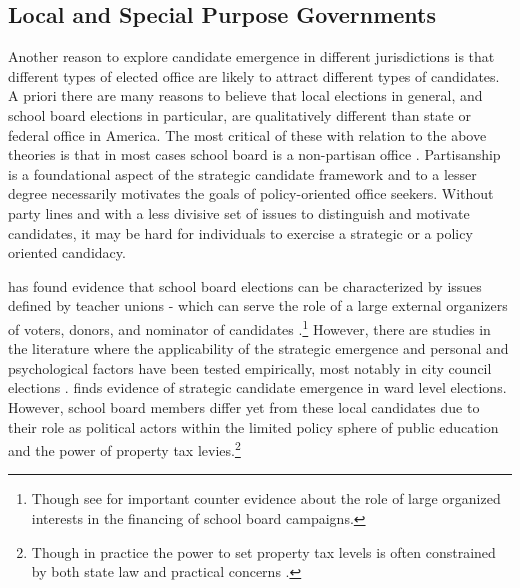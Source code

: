 \subsection{Local and Special Purpose Governments}

Another reason to explore candidate emergence in different jurisdictions is that 
different types of elected office are likely to attract different types of 
candidates. A priori there are many reasons to believe that local elections in general, and 
school board elections in particular, are qualitatively different than state or 
federal office in America. The most critical of these with relation to the above 
theories is that in most cases school board is a non-partisan office \citep{oliver}. 
Partisanship is a foundational aspect of the strategic candidate framework and 
to a lesser degree necessarily motivates the goals of policy-oriented office 
seekers. Without party lines and with a less divisive set of issues to 
distinguish and motivate candidates, it may be hard for individuals to exercise 
a strategic or a policy oriented candidacy. 

\citet{RefWorks:218} has found 
evidence that school board elections can be characterized by issues defined by 
teacher unions - which can serve the role of a large external organizers of 
voters, donors, and nominator of candidates \citep{RefWorks:207}.\footnote{Though 
see \citet{boardfundraising2008} for important counter evidence about the role 
of large organized interests in the financing of school board campaigns.} However, 
there are studies in the literature where the applicability of the 
strategic emergence and personal and psychological factors have been tested 
empirically, most notably in city council elections \citep{boardfundraising2008, prewitt1, 
bledsoe1}. \citet{Krebs01111999} finds evidence of strategic candidate emergence 
in ward level elections. However, school board members differ yet from these local 
candidates due to their role as political actors within the limited policy sphere 
of public education and the power of property tax levies.\footnote{Though in practice 
the power to set property tax levels is often constrained by both state law and 
practical concerns \citep{berry2}.} 

